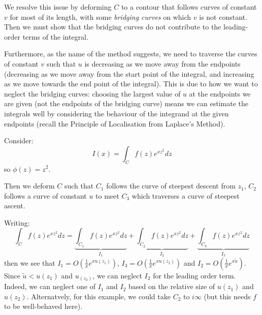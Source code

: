 \documentclass[../Main.tex]{subfiles}
\begin{document}
We resolve this issue by deforming $C$ to a contour that follows curves of constant $v$ for most of its length, with some \textit{bridging curves} on which $v$ is not constant. Then we must show that the bridging curves do not contribute to the leading-order terms of the integral.

Furthermore, as the name of the method suggests, we need to traverse the curves of constant $v$ such that $u$ is decreasing as we move away from the endpoints (decreasing as we move away from the start point of the integral, and increasing as we move towards the end point of the integral). This is due to how we want to neglect the bridging curves: choosing the largest value of $u$ at the endpoints we are given (not the endpoints of the bridging curve) means we can estimate the integrals well by considering the behaviour of the integrand at the given endpoints (recall the Principle of Localisation from Laplace's Method).
\begin{example}
    Consider:
    \begin{equation*}
        I(x) = \int_C f(z) e^{xz^2} dz
    \end{equation*}
    so $\phi(z) = z^2$.

    
    Then we deform $C$ such that $C_1$ follows the curve of steepest descent from $z_1$, $C_2$ follows a curve of constant $u$ to meet $C_3$ which traverses a curve of steepest ascent.
    
    Writing:
    \begin{equation*}
        \int_C f(z) e^{xz^2} dz = \underbrace{\int_{C_1} f(z) e^{xz^2} dz}_{I_1} + \underbrace{\int_{C_2} f(z) e^{xz^2} dz}_{I_2} + \underbrace{\int_{C_3} f(z) e^{xz^2} dz}_{I_3}
    \end{equation*}
    then we see that $I_1 = O\left(\frac1x e^{xu(z_1)}\right)$, $I_3 = O\left(\frac1x e^{xu(z_2)}\right)$ and $I_2 = O\left(\frac1x e^{x\tilde{u}}\right)$. Since $\tilde{u} < u(z_1)$ and $u_(z_2)$, we can neglect $I_2$ for the leading order term. Indeed, we can neglect one of $I_1$ and $I_2$ based on the relative size of $u(z_1)$ and $u(z_2)$. Alternatvely, for this example, we could take $C_2$ to $i\infty$ (but this needs $f$ to be well-behaved here).
\end{example}
\end{document}
